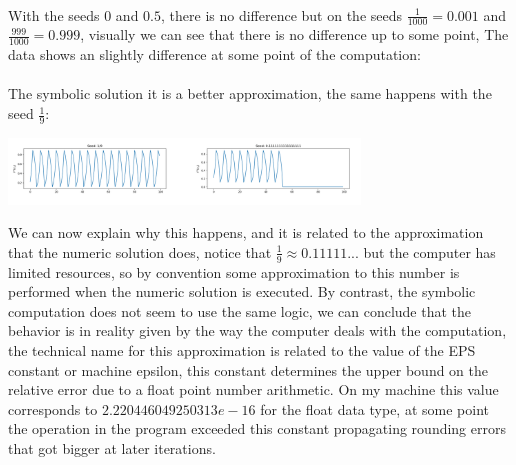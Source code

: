 \documentclass{article}
\begin{document}
\paragraph{}With the seeds $0$ and $0.5$, there is no difference but on the seeds $\frac{1}{1000} = 0.001$ and $\frac{999}{1000} = 0.999$, visually we can see that there is no difference up to some point, The data shows an slightly difference at some point of the computation:
\begin{center}
\end{center}
\paragraph{}The symbolic solution it is a better approximation, the same happens with the seed $\frac{1}{9}$:
\begin{center}
	\includegraphics[width=0.7\textwidth]{9.png}
\end{center}
\begin{center}
\end{center}
We can now explain why this happens, and it is related to the approximation that the numeric solution does, notice that $\frac{1}{9} \approx 0.11111...$ but the computer has limited resources, so by convention some approximation to this number is performed when the numeric solution is executed. By contrast, the symbolic computation does not seem to use the same logic, we can conclude that the behavior is in reality given by the way the computer deals with the computation, the technical name for this approximation is related to the value of the EPS constant or machine epsilon, this constant determines the upper bound on the relative error due to a float point number arithmetic. On my machine this value corresponds to $2.220446049250313e-16$ for the float data type, at some point the operation in the program exceeded this constant propagating rounding errors that got bigger at later iterations.
\end{document}
